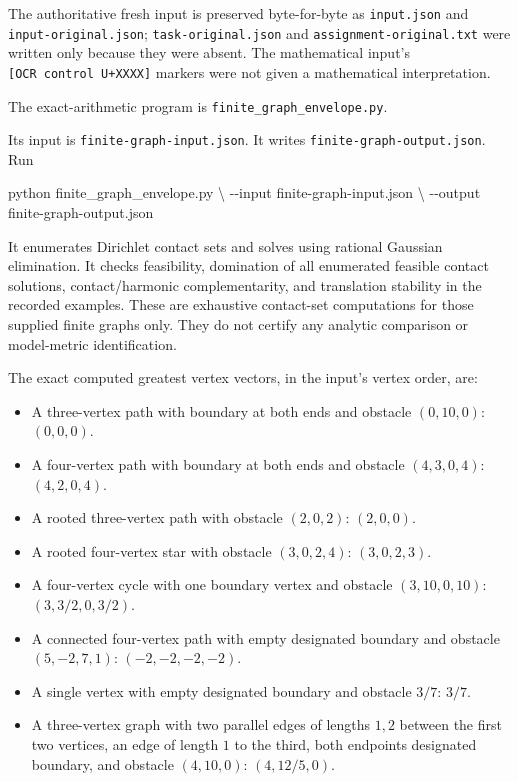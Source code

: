 \documentclass[
  11pt,
]{article}
\newenvironment{Shaded}{}{}
\newcommand{\NormalTok}[1]{#1}
\providecommand{\tightlist}{%
  \setlength{\itemsep}{0pt}\setlength{\parskip}{0pt}}
\begin{document}
The authoritative fresh input is preserved byte-for-byte as
\texttt{input.json} and \texttt{input-original.json};
\texttt{task-original.json} and \texttt{assignment-original.txt} were
written only because they were absent. The mathematical input's
\texttt{{[}OCR\ control\ U+XXXX{]}} markers were not given a
mathematical interpretation.

The exact-arithmetic program is \texttt{finite\_graph\_envelope.py}.

Its input is \texttt{finite-graph-input.json}. It writes
\texttt{finite-graph-output.json}. Run

\begin{Shaded}
\begin{Highlighting}[]
\NormalTok{python finite\_graph\_envelope.py \textbackslash{}}
\NormalTok{  {-}{-}input finite{-}graph{-}input.json \textbackslash{}}
\NormalTok{  {-}{-}output finite{-}graph{-}output.json}
\end{Highlighting}
\end{Shaded}

It enumerates Dirichlet contact sets and solves using rational Gaussian
elimination. It checks feasibility, domination of all enumerated
feasible contact solutions, contact/harmonic complementarity, and
translation stability in the recorded examples. These are exhaustive
contact-set computations for those supplied finite graphs only. They do
not certify any analytic comparison or model-metric identification.

The exact computed greatest vertex vectors, in the input's vertex order,
are:

\begin{itemize}
\tightlist
\item
  A three-vertex path with boundary at both ends and obstacle
  \((0,10,0)\): \((0,0,0)\).
\item
  A four-vertex path with boundary at both ends and obstacle
  \((4,3,0,4)\): \((4,2,0,4)\).
\item
  A rooted three-vertex path with obstacle \((2,0,2)\): \((2,0,0)\).
\item
  A rooted four-vertex star with obstacle \((3,0,2,4)\): \((3,0,2,3)\).
\item
  A four-vertex cycle with one boundary vertex and obstacle
  \((3,10,0,10)\): \((3,3/2,0,3/2)\).
\item
  A connected four-vertex path with empty designated boundary and
  obstacle \((5,-2,7,1)\): \((-2,-2,-2,-2)\).
\item
  A single vertex with empty designated boundary and obstacle \(3/7\):
  \(3/7\).
\item
  A three-vertex graph with two parallel edges of lengths \(1,2\)
  between the first two vertices, an edge of length \(1\) to the third,
  both endpoints designated boundary, and obstacle \((4,10,0)\):
  \((4,12/5,0)\).
\end{itemize}
\end{document}
